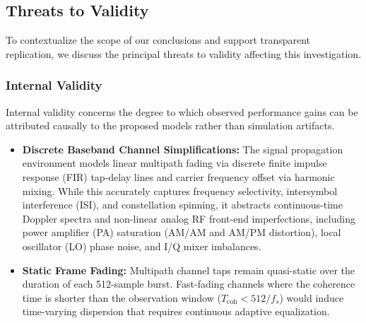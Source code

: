 \subsection{Threats to Validity}
\label{subsec:threats_validity}

To contextualize the scope of our conclusions and support transparent replication, we discuss the principal threats to validity affecting this investigation.

\subsubsection{Internal Validity}
Internal validity concerns the degree to which observed performance gains can be attributed causally to the proposed models rather than simulation artifacts.
\begin{itemize}
    \item \textbf{Discrete Baseband Channel Simplifications:} The signal propagation environment models linear multipath fading via discrete finite impulse response (FIR) tap-delay lines and carrier frequency offset via harmonic mixing. While this accurately captures frequency selectivity, intersymbol interference (ISI), and constellation spinning, it abstracts continuous-time Doppler spectra and non-linear analog RF front-end imperfections, including power amplifier (PA) saturation (AM/AM and AM/PM distortion), local oscillator (LO) phase noise, and I/Q mixer imbalances.
    \item \textbf{Static Frame Fading:} Multipath channel taps remain quasi-static over the duration of each 512-sample burst. Fast-fading channels where the coherence time is shorter than the observation window ($T_{\text{coh}} < 512 / f_s$) would induce time-varying dispersion that requires continuous adaptive equalization.
\end{itemize}

